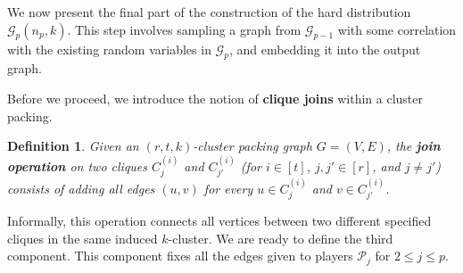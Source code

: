 \documentclass[11pt]{article}
\newtheorem{definition}[lemma]{Definition}
\theoremstyle{definition}
\renewcommand{\leq}{\leqslant}
\newcommand{\player}[1]{\ensuremath{\mathcal{P}_{#1}}}
\newcommand{\cG}{\ensuremath{\mathcal{G}}}
\newcommand{\cliqnum}[2]{\ensuremath{C^{(#1)}_{#2}}}
\begin{document}
	We now present the final part of the construction of the hard distribution $\cG_p(n_{p},k)$. This step involves sampling a graph from $\cG_{p-1}$ with some correlation with the existing random variables in $\cG_p$, and embedding it into the output graph. 

	
	Before we proceed, we introduce the notion of \textbf{clique joins} within a cluster packing.

	\begin{definition}\label{def:join-cliques}
		Given an $(r, t, k)$-cluster packing graph $G = (V, E)$, the \textbf{join operation} on two cliques $\cliqnum{i}{j}$ and $\cliqnum{i}{j'}$ (for $i \in [t]$, $j, j' \in [r]$, and $j \neq j'$) consists of adding all edges $(u, v)$ for every $u \in \cliqnum{i}{j}$ and $v \in \cliqnum{i}{j'}$.
	\end{definition} 
	
	Informally, this operation connects all vertices between two different specified cliques in the same induced $k$-cluster. 
	We are ready to define the third component. This component fixes all the edges given to players $\player{j}$ for $2 \leq j \leq p$. 
	
\end{document}

